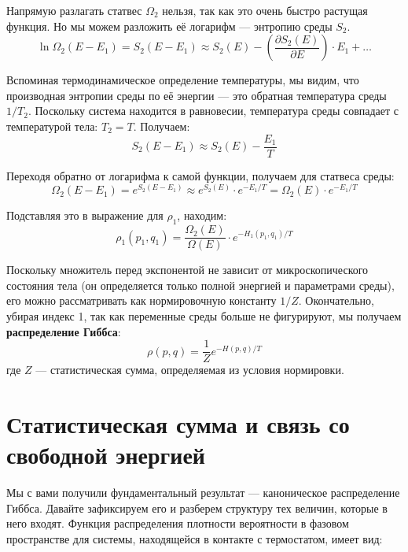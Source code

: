 \documentclass[../general/general]{subfiles}
\begin{document}
Напрямую разлагать статвес $\Omega_2$ нельзя, так как это очень быстро растущая функция. Но мы можем разложить её логарифм — энтропию среды $S_2$. 
\begin{equation}
\ln \Omega_2(E - E_1) = S_2(E - E_1) \approx S_2(E) - \left( \frac{\partial S_2(E)}{\partial E} \right) \cdot E_1 + \dots
\end{equation}

Вспоминая термодинамическое определение температуры, мы видим, что производная энтропии среды по её энергии — это обратная температура среды $1/T_2$. Поскольку система находится в равновесии, температура среды совпадает с температурой тела: $T_2 = T$. Получаем:
\begin{equation}
S_2(E - E_1) \approx S_2(E) - \frac{E_1}{T}
\end{equation}

Переходя обратно от логарифма к самой функции, получаем для статвеса среды:
\begin{equation}
\Omega_2(E - E_1) = e^{S_2(E - E_1)} \approx e^{S_2(E)} \cdot e^{-E_1/T} = \Omega_2(E) \cdot e^{-E_1/T}
\end{equation}

Подставляя это в выражение для $\rho_1$, находим:
\begin{equation}
\rho_1(p_1, q_1) = \frac{\Omega_2(E)}{\Omega(E)} \cdot e^{-H_1(p_1, q_1)/T}
\end{equation}

Поскольку множитель перед экспонентой не зависит от микроскопического состояния тела (он определяется только полной энергией и параметрами среды), его можно рассматривать как нормировочную константу $1/Z$. Окончательно, убирая индекс 1, так как переменные среды больше не фигурируют, мы получаем \textbf{распределение Гиббса}:
\begin{equation}
\rho(p, q) = \frac{1}{Z} e^{-H(p, q)/T}
\end{equation}
где $Z$ — статистическая сумма, определяемая из условия нормировки.


\section{Статистическая сумма и связь со свободной энергией}

Мы с вами получили фундаментальный результат — каноническое распределение Гиббса. Давайте зафиксируем его и разберем структуру тех величин, которые в него входят. Функция распределения плотности вероятности в фазовом пространстве для системы, находящейся в контакте с термостатом, имеет вид:
\end{document}
